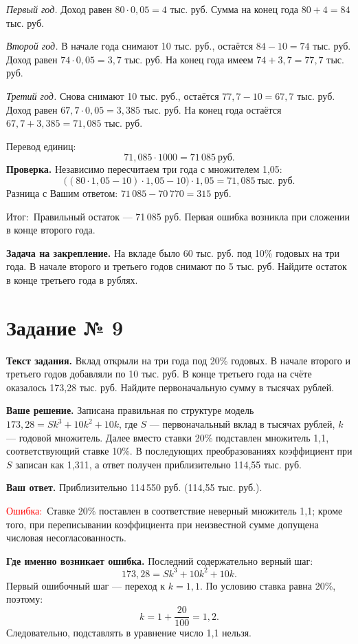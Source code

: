 \documentclass[12pt,a4paper]{article}
\newcommand{\err}{\textcolor{red}{Ошибка:}}
\newcommand{\result}{\textcolor{teal!60!black}{Итог:}}
\begin{document}
\textit{Первый год.} Доход равен $80\cdot0{,}05=4$ тыс. руб. Сумма на конец года $80+4=84$ тыс. руб.

\textit{Второй год.} В начале года снимают 10 тыс. руб., остаётся $84-10=74$ тыс. руб. Доход равен $74\cdot0{,}05=3{,}7$ тыс. руб. На конец года имеем $74+3{,}7=77{,}7$ тыс. руб.

\textit{Третий год.} Снова снимают 10 тыс. руб., остаётся $77{,}7-10=67{,}7$ тыс. руб. Доход равен $67{,}7\cdot0{,}05=3{,}385$ тыс. руб. На конец года остаётся $67{,}7+3{,}385=71{,}085$ тыс. руб.

Перевод единиц:
\[
71{,}085\cdot1000=71\,085\ \text{руб.}
\]
\textbf{Проверка.} Независимо пересчитаем три года с множителем 1,05:
\[
\bigl((80\cdot1{,}05-10)\cdot1{,}05-10\bigr)\cdot1{,}05
=71{,}085\ \text{тыс. руб.}
\]
Разница с Вашим ответом: $71\,085-70\,770=315$ руб.

\result\ Правильный остаток --- 71\,085 руб. Первая ошибка возникла при сложении в конце второго года.

\textbf{Задача на закрепление.} На вкладе было 60 тыс. руб. под 10\% годовых на три года. В начале второго и третьего годов снимают по 5 тыс. руб. Найдите остаток в конце третьего года в рублях.
\newpage
{}\label{task:9}
\section*{Задание № 9}
\textbf{Текст задания.} Вклад открыли на три года под 20\% годовых. В начале второго и третьего годов добавляли по 10 тыс. руб. В конце третьего года на счёте оказалось 173,28 тыс. руб. Найдите первоначальную сумму в тысячах рублей.

\textbf{Ваше решение.} Записана правильная по структуре модель $173{,}28=Sk^3+10k^2+10k$, где $S$ --- первоначальный вклад в тысячах рублей, $k$ --- годовой множитель. Далее вместо ставки 20\% подставлен множитель 1,1, соответствующий ставке 10\%. В последующих преобразованиях коэффициент при $S$ записан как 1,311, а ответ получен приблизительно 114,55 тыс. руб.

\textbf{Ваш ответ.} Приблизительно 114\,550 руб. (114,55 тыс. руб.).

\err\ Ставке 20\% поставлен в соответствие неверный множитель 1,1; кроме того, при переписывании коэффициента при неизвестной сумме допущена числовая несогласованность.

\textbf{Где именно возникает ошибка.} Последний содержательно верный шаг:
\[
173{,}28=Sk^3+10k^2+10k.
\]
Первый ошибочный шаг --- переход к $k=1{,}1$. По условию ставка равна 20\%, поэтому:
\[
k=1+\frac{20}{100}=1{,}2.
\]
Следовательно, подставлять в уравнение число 1,1 нельзя.
\end{document}
